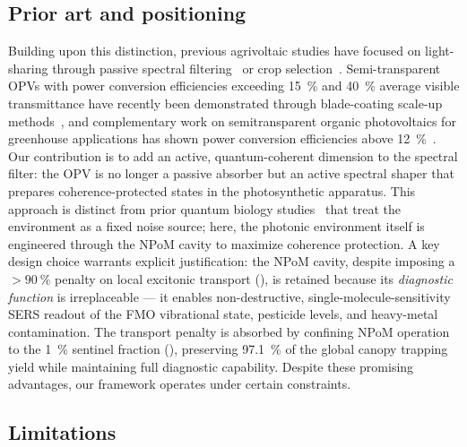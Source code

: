 \documentclass[12pt]{iopart}
\begin{document}
\subsection{Prior art and positioning}

Building upon this distinction, previous agrivoltaic studies have focused on light-sharing through passive spectral filtering~\cite{Thompson2020} or crop selection~\cite{Dupraz2011}.
Semi-transparent OPVs with power conversion efficiencies exceeding \qty{15}{\percent} and \qty{40}{\percent} average visible transmittance have recently been demonstrated through blade-coating scale-up methods~\cite{Ravishankar2024}, and complementary work on semitransparent organic photovoltaics for greenhouse applications has shown power conversion efficiencies above \qty{12}{\percent}~\cite{Alshareef2024}.
Our contribution is to add an active, quantum-coherent dimension to the spectral filter: the OPV is no longer a passive absorber but an active spectral shaper that prepares coherence-protected states in the photosynthetic apparatus.
This approach is distinct from prior quantum biology studies~\cite{Scholes2015} that treat the environment as a fixed noise source; here, the photonic environment itself is engineered through the NPoM cavity to maximize coherence protection.
A key design choice warrants explicit justification: the NPoM cavity, despite imposing a $>\qty{90}{\percent}$ penalty on local excitonic transport (), is retained because its \emph{diagnostic function} is irreplaceable --- it enables non-destructive, single-molecule-sensitivity SERS readout of the FMO vibrational state, pesticide levels, and heavy-metal contamination. The transport penalty is absorbed by confining NPoM operation to the \qty{1}{\percent} sentinel fraction (), preserving \qty{97.1}{\percent} of the global canopy trapping yield while maintaining full diagnostic capability. Despite these promising advantages, our framework operates under certain constraints.

\subsection{Limitations}
\end{document}
